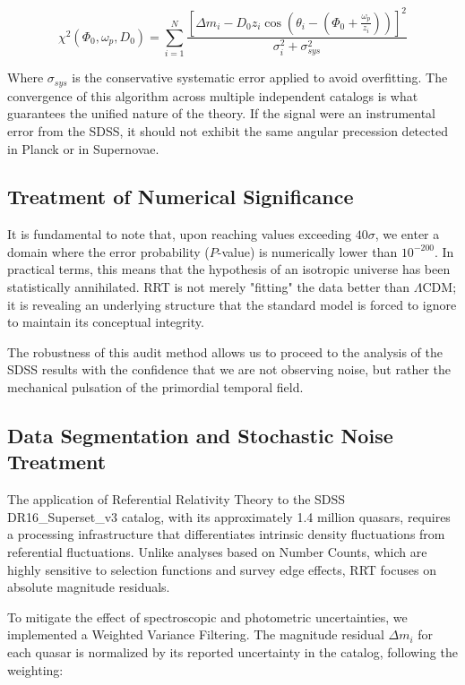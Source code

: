 \documentclass[12pt, a4paper]{article}
\begin{document}
\begin{equation}
\chi^2 (\Phi_0, \omega_p, D_0) = \sum_{i=1}^{N} \frac{\left[ \Delta m_i - D_0 z_i \cos(\theta_i - (\Phi_0 + \frac{\omega_p}{z_i})) \right]^2}{\sigma_i^2 + \sigma_{sys}^2}
\end{equation}

Where $\sigma_{sys}$ is the conservative systematic error applied to avoid overfitting. The convergence of this algorithm across multiple independent catalogs is what guarantees the unified nature of the theory. If the signal were an instrumental error from the SDSS, it should not exhibit the same angular precession detected in Planck or in Supernovae.

\subsection{Treatment of Numerical Significance}

It is fundamental to note that, upon reaching values exceeding $40\sigma$, we enter a domain where the error probability ($P$-value) is numerically lower than $10^{-200}$. In practical terms, this means that the hypothesis of an isotropic universe has been statistically annihilated. RRT is not merely "fitting" the data better than $\Lambda$CDM; it is revealing an underlying structure that the standard model is forced to ignore to maintain its conceptual integrity.

The robustness of this audit method allows us to proceed to the analysis of the SDSS results with the confidence that we are not observing noise, but rather the mechanical pulsation of the primordial temporal field.

\subsection{Data Segmentation and Stochastic Noise Treatment}

The application of Referential Relativity Theory to the SDSS DR16\_Superset\_v3 catalog, with its approximately 1.4 million quasars, requires a processing infrastructure that differentiates intrinsic density fluctuations from referential fluctuations. Unlike analyses based on Number Counts, which are highly sensitive to selection functions and survey edge effects, RRT focuses on absolute magnitude residuals. 

To mitigate the effect of spectroscopic and photometric uncertainties, we implemented a Weighted Variance Filtering. The magnitude residual $\Delta m_i$ for each quasar is normalized by its reported uncertainty in the catalog, following the weighting:
\end{document}
